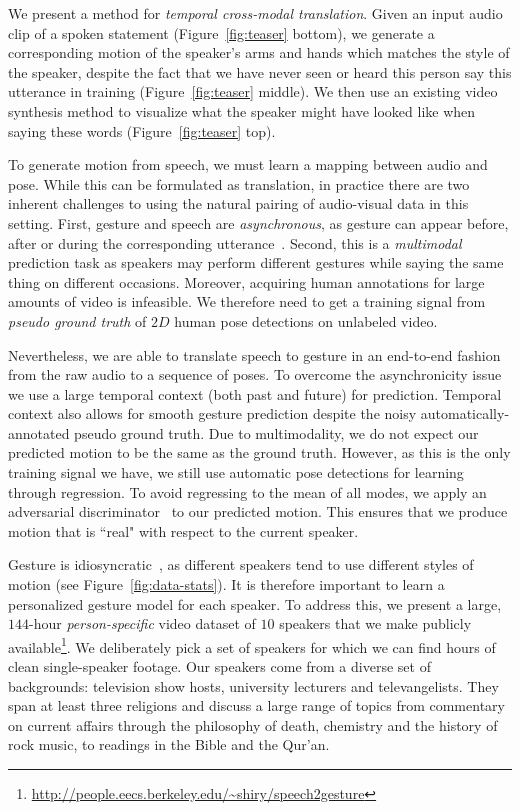 \documentclass[10pt,twocolumn,letterpaper]{article}
\begin{document}
We present a method for \emph{temporal cross-modal translation}. Given an input audio clip of a spoken statement (Figure~\ref{fig:teaser} bottom), we generate a corresponding motion of the speaker's arms and hands which matches the style of the speaker, despite the fact that we have never seen or heard this person say this utterance in training (Figure~\ref{fig:teaser} middle). We then use an existing video synthesis method to visualize what the speaker might have looked like when saying these words (Figure~\ref{fig:teaser} top).

To generate motion from speech, we must learn a mapping between audio and pose. While this can be formulated as translation, in practice there are two inherent challenges to using the natural pairing of audio-visual data in this setting. First, gesture and speech are 
\emph{asynchronous}, as gesture can appear before, after or during the corresponding utterance~\cite{Butterworth}. 
Second, this is a \emph{multimodal} prediction task as speakers may perform different gestures while saying the same thing on different occasions. Moreover, acquiring human annotations for large amounts of video is infeasible. We therefore need to get a training signal from \emph{pseudo ground truth} of $2D$ human pose detections on unlabeled video.

Nevertheless, we are able to translate speech to gesture in an end-to-end fashion from the
raw audio to a sequence of poses. To overcome the asynchronicity issue we use a large temporal context (both past and future) for prediction. Temporal context also allows for smooth gesture prediction despite the noisy automatically-annotated pseudo ground truth. Due to multimodality, we do not expect our predicted motion to be the same as the ground truth. However, as this is the only training signal we have, we still use automatic pose detections for learning through regression. To avoid regressing to the mean of all modes, we apply an adversarial discriminator~\cite{gan} to our predicted motion. This ensures that we produce motion that is ``real" with respect to the current speaker.

Gesture is idiosyncratic~\cite{McNeill92}, as different speakers tend to use different styles
of motion (see Figure~\ref{fig:data-stats}). It is therefore important to learn a personalized gesture model for each speaker. To address this, we present a large, $144$-hour \textit{person-specific} video dataset of $10$ speakers that we make publicly available\footnote{\url{http://people.eecs.berkeley.edu/~shiry/speech2gesture}}. We deliberately pick a set of speakers for which we can find hours of clean single-speaker footage. Our speakers come from a diverse set of backgrounds: television show hosts, university lecturers and televangelists. They span at least three religions and discuss a large range of topics from commentary on current affairs through the philosophy of death, chemistry and the history of rock music, to readings in the Bible and the Qur'an.
\end{document}
